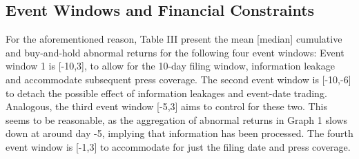 \documentclass[12pt]{article}
\begin{document}
\subsection{Event Windows and Financial Constraints}

For the aforementioned reason, Table III present the mean [median] cumulative and buy-and-hold abnormal returns for the following four event windows: Event window 1 is [-10,3], to allow for the 10-day filing window, information leakage and accommodate subsequent press coverage. The second event window is [-10,-6] to detach the possible effect of information leakages and event-date trading. Analogous, the third event window [-5,3] aims to control for these two. This seems to be reasonable, as the aggregation of abnormal returns in Graph 1 slows down at around day -5, implying that information has been processed. The fourth event window is [-1,3] to accommodate for just the filing date and press coverage.

\end{document}
